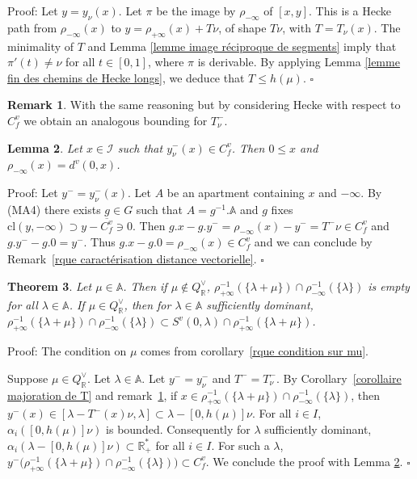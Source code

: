 \documentclass[12pt]{article}
\theoremstyle{plain}
\newtheorem{thm}{Theorem}[section] %
\newtheorem{lemme}[thm]{Lemma}
\theoremstyle{definition}
\newtheorem{rque}[thm]{Remark}
\newcommand{\R}{\mathbb{R}}
\newcommand{\A}{\mathbb{A}}
\begin{document}
Proof: Let $y=y_\nu(x)$. Let $\pi$ be the image by $\rho_{-\infty}$ of $[x,y]$. This is a Hecke path from $\rho_{-\infty}(x)$ to $y=\rho_{+\infty}(x)+T\nu$, of shape $T\nu$, with $T=T_\nu(x)$. The minimality of $T$ and Lemma \ref{lemme image réciproque de segments} imply that $\pi'(t)\neq \nu$ for all $t\in [0,1]$, where $\pi$ is derivable. By applying Lemma \ref{lemme fin des chemins de Hecke longs}, we deduce that $T\leq h(\mu)$. $\square$


\begin{rque}\label{rque majoration de T^-}
With the same reasoning but by considering Hecke with respect to $C^v_f$ we obtain an analogous bounding for $T_\nu^-$.
\end{rque}


\begin{lemme}\label{lemme_rétraction et distance vectorielle}
Let $x\in \mathcal{I}$ such that $y_\nu^-(x)\in C^v_f$. Then $0\leq x$ and $\rho_{-\infty}(x)=d^v(0,x)$.
\end{lemme}

Proof: Let $y^-=y^-_\nu(x)$. Let $A$ be an apartment containing $x$ and $-\infty$. By (MA4) there exists $g\in G$ such that $A=g^{-1}.\A$ and $g$ fixes $\mathrm{cl}(y,-\infty)\supset y-\overline{C_f^v}\ni 0$. Then $g.x-g.y^-=\rho_{-\infty}(x)-y^-=T^-\nu\in C_f^v$ and $g.y^--g.0=y^-$. Thus $g.x-g.0=\rho_{-\infty}(x)\in C_f^v$ and we can conclude by Remark~\ref{rque caractérisation distance vectorielle}. $\square$




\begin{thm}\label{thm inclusion}
Let $\mu\in \A$. Then if $\mu\notin Q_{\R}^\vee$, $\rho_{+\infty}^{-1}(\{\lambda+\mu\})\cap \rho_{-\infty}^{-1}(\{\lambda\})$ is empty for all $\lambda\in \A$. If $\mu\in Q^\vee_{\R}$, then for $\lambda\in \A$ sufficiently dominant, $\rho_{+\infty}^{-1}(\{\lambda+\mu\})\cap \rho_{-\infty}^{-1}(\{\lambda\})\subset S^v(0,\lambda)\cap \rho_{+\infty}^{-1}(\{\lambda+\mu\}) $. 
\end{thm}

Proof: The condition on $\mu$ comes from corollary~\ref{rque condition sur mu}. 

Suppose $\mu\in Q^\vee_\R$.
Let $\lambda\in \A$. Let $y^-=y^-_\nu$ and $T^-=T_\nu^-$. By Corollary~\ref{corollaire majoration de T} and remark~\ref{rque majoration de T^-}, if $x\in \rho_{+\infty}^{-1}(\{\lambda+\mu\})\cap \rho_{-\infty}^{-1}(\{\lambda\})$, then $y^-(x)\in [\lambda-T^-(x)\nu, \lambda]\subset \lambda-[0,h(\mu)]\nu$. 
For all $i\in I$, $\alpha_i([0,h(\mu)]\nu)$ is bounded. Consequently for $\lambda$ sufficiently dominant, $\alpha_i(\lambda-[0,h(\mu)]\nu)\subset \mathbb{R}^*_+$ for all $i\in I$.  For such a $\lambda$,  $y^-\big(\rho_{+\infty}^{-1}(\{\lambda+\mu\})\cap \rho_{-\infty}^{-1}(\{\lambda\})\big)\subset C^v_f$. We conclude the proof with Lemma \ref{lemme_rétraction et distance vectorielle}.
 $\square$
\end{document}
